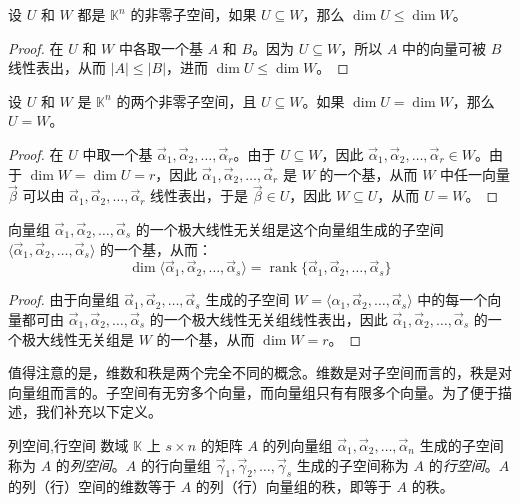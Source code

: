 \begin{theorem}
	设 $U$ 和 $W$ 都是 $\mathbb K^n$ 的非零子空间，如果 $U \subseteq W$，那么 $\dim U \le \dim W$。
\end{theorem}

\begin{proof}
	在 $U$ 和 $W$ 中各取一个基 $A$ 和 $B$。因为 $U \subseteq W$，所以 $A$ 中的向量可被 $B$ 线性表出，从而 $|A| \le |B|$，进而 $\dim U \le \dim W$。
\end{proof}

\begin{theorem}
	设 $U$ 和 $W$ 是 $\mathbb K^n$ 的两个非零子空间，且 $U \subseteq W$。如果 $\dim U = \dim W$，那么 $U = W$。
\end{theorem}

\begin{proof}
	在 $U$ 中取一个基 $\vec \alpha_1, \vec \alpha_2, \ldots, \vec \alpha_r$。由于 $U \subseteq W$，因此 $\vec \alpha_1, \vec \alpha_2, \ldots, \vec \alpha_r \in W$。由于 $\dim W = \dim U = r$，因此 $\vec \alpha_1, \vec \alpha_2, \ldots, \vec \alpha_r$ 是 $W$ 的一个基，从而 $W$ 中任一向量 $\vec \beta$ 可以由 $\vec \alpha_1, \vec \alpha_2, \ldots, \vec \alpha_r$ 线性表出，于是 $\vec \beta \in U$，因此 $W \subseteq U$，从而 $U = W$。
\end{proof}

\begin{theorem}
	向量组 $\vec \alpha_1, \vec \alpha_2, \ldots, \vec \alpha_s$ 的一个极大线性无关组是这个向量组生成的子空间 $\langle \vec \alpha_1, \vec \alpha_2, \ldots, \vec \alpha_s \rangle$ 的一个基，从而：
	$$
	\dim \langle \vec \alpha_1, \vec \alpha_2, \ldots, \vec \alpha_s \rangle = \operatorname{rank} \{\vec \alpha_1, \vec \alpha_2, \ldots, \vec \alpha_s\}
	$$
\end{theorem}

\begin{proof}
	由于向量组 $\vec \alpha_1, \vec \alpha_2, \ldots, \vec \alpha_s$ 生成的子空间 $W = \langle \alpha_1, \vec \alpha_2, \ldots, \vec \alpha_s \rangle$ 中的每一个向量都可由 $\vec \alpha_1, \vec \alpha_2, \ldots, \vec \alpha_s$ 的一个极大线性无关组线性表出，因此 $\vec \alpha_1, \vec \alpha_2, \ldots, \vec \alpha_s$ 的一个极大线性无关组是 $W$ 的一个基，从而 $\dim W = r$。
\end{proof}

值得注意的是，维数和秩是两个完全不同的概念。维数是对子空间而言的，秩是对向量组而言的。子空间有无穷多个向量，而向量组只有有限多个向量。为了便于描述，我们补充以下定义。

\begin{definition}{列空间,行空间}
	数域 $\mathbb K$ 上 $s \times n$ 的矩阵 $A$ 的列向量组 $\vec \alpha_1, \vec \alpha_2, \ldots, \vec \alpha_n$ 生成的子空间称为 $A$ 的\emph{列空间}。$A$ 的行向量组 $\vec \gamma_1, \vec \gamma_2, \ldots, \vec \gamma_s$ 生成的子空间称为 $A$ 的\emph{行空间}。$A$ 的列（行）空间的维数等于 $A$ 的列（行）向量组的秩，即等于 $A$ 的秩。
\end{definition}